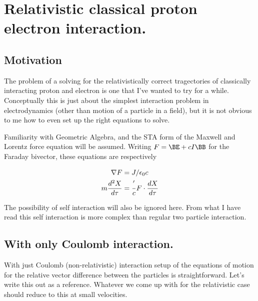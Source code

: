 

\chapter{Relativistic classical proton electron interaction.}
\label{chap:nuclearInteraction}
{}
\date{Sept 13, 2009}

\beginArtWithToc

\section{Motivation}

The problem of a solving for the relativistically correct tragectories of classically interacting proton and electron is one that I've wanted to try for a while.  Conceptually this is just about the simplest interaction problem in electrodynamics (other than motion of a particle in a field), but it is not obvious to me how to even set up the right equations to solve.

Familiarity with Geometric Algebra, and the STA form of the Maxwell and Lorentz force equation will be assumed.  Writing $F = \BE + c I \BB$ for the Faraday bivector, these equations are respectively

\begin{align}\label{eqn:nuclearInteraction:boo1}
\nabla F &= J/\epsilon_0 c \\
m\frac{d^2 X}{d\tau} &= \frac'{c} F \cdot \frac{dX}{d\tau}
\end{align}

The possibility of self interaction will also be ignored here.  From what I have read this self interaction is more complex than regular two particle interaction.

\section{With only Coulomb interaction.}

With just Coulomb (non-relativistic) interaction setup of the equations of motion for the relative vector difference between the particles is straightforward.  Let's write this out as a reference.  Whatever we come up with for the relativistic case should reduce to this at small velocities.


